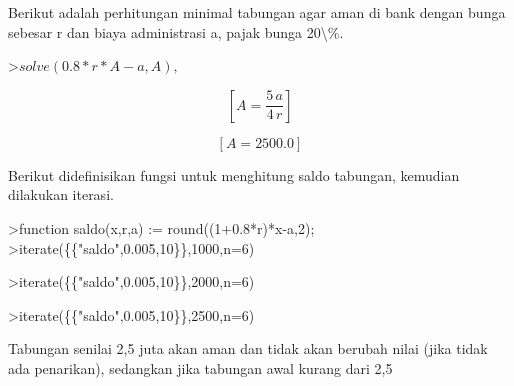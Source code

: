 \documentclass[a4paper,10pt]{article}
\begin{document}
\begin{eulernotebook}
\begin{eulercomment}
\begin{eulercomment}
\begin{eulercomment}
\begin{eulercomment}
\begin{eulercomment}
\begin{eulercomment}
\begin{eulercomment}
\begin{eulercomment}
\begin{eulercomment}
\begin{eulercomment}
\begin{eulercomment}
\begin{eulercomment}
\begin{eulercomment}
\begin{eulercomment}
\begin{eulercomment}
\begin{eulercomment}
\begin{eulercomment}
\begin{eulercomment}
\begin{eulercomment}
\begin{eulercomment}
\begin{eulercomment}
\begin{eulercomment}
\begin{eulercomment}
\begin{eulercomment}
\begin{eulercomment}
\begin{eulercomment}
\begin{eulercomment}
\begin{eulercomment}
\begin{eulercomment}
Berikut adalah perhitungan minimal tabungan agar aman di bank dengan
bunga sebesar r dan biaya administrasi a, pajak bunga 20\textbackslash{}\%.
\end{eulercomment}
\begin{eulerprompt}
>$solve(0.8*r*A-a,A), $%
\end{eulerprompt}
\begin{eulerformula}
\[
\left[ A=\frac{5\,a}{4\,r} \right] 
\]
\end{eulerformula}
\begin{eulerformula}
\[
\left[ A=2500.0 \right] 
\]
\end{eulerformula}
\begin{eulercomment}
Berikut didefinisikan fungsi untuk menghitung saldo tabungan, kemudian
dilakukan iterasi.
\end{eulercomment}
\begin{eulerprompt}
>function saldo(x,r,a) := round((1+0.8*r)*x-a,2);
>iterate(\{\{"saldo",0.005,10\}\},1000,n=6)
\end{eulerprompt}
\begin{euleroutput}
  [1000,  994,  987.98,  981.93,  975.86,  969.76,  963.64]
\end{euleroutput}
\begin{eulerprompt}
>iterate(\{\{"saldo",0.005,10\}\},2000,n=6)
\end{eulerprompt}
\begin{euleroutput}
  [2000,  1998,  1995.99,  1993.97,  1991.95,  1989.92,  1987.88]
\end{euleroutput}
\begin{eulerprompt}
>iterate(\{\{"saldo",0.005,10\}\},2500,n=6)
\end{eulerprompt}
\begin{euleroutput}
  [2500,  2500,  2500,  2500,  2500,  2500,  2500]
\end{euleroutput}
\begin{eulercomment}
Tabungan senilai 2,5 juta akan aman dan tidak akan berubah nilai (jika
tidak ada penarikan), sedangkan jika tabungan awal kurang dari 2,5

\end{eulercomment}
\end{eulercomment}
\end{eulercomment}
\end{eulercomment}
\end{eulercomment}
\end{eulercomment}
\end{eulercomment}
\end{eulercomment}
\end{eulercomment}
\end{eulercomment}
\end{eulercomment}
\end{eulercomment}
\end{eulercomment}
\end{eulercomment}
\end{eulercomment}
\end{eulercomment}
\end{eulercomment}
\end{eulercomment}
\end{eulercomment}
\end{eulercomment}
\end{eulercomment}
\end{eulercomment}
\end{eulercomment}
\end{eulercomment}
\end{eulercomment}
\end{eulercomment}
\end{eulercomment}
\end{eulercomment}
\end{eulercomment}
\end{eulernotebook}
\end{document}
